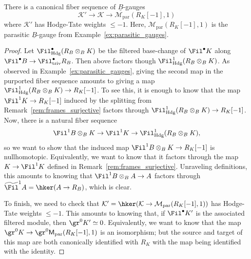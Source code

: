 \documentclass[10pt]{amsart}
\begin{document}
\begin{lemma}
\label{lem:factors_through_hodge}
There is a canonical fiber sequence of $\underline{B}$-gauges
\[
\mathcal{K}'\to \mathcal{K}\to \mathcal{M}_{\mathrm{par}}(R_K[-1],1)
\]
where $\mathcal{K}'$ has Hodge-Tate weights $\le -1$. Here, $\mathcal{M}_{\mathrm{par}}(R_K[-1],1)$ is the parasitic $\underline{B}$-gauge from Example~\ref{ex:parasitic_gauges}. 
\end{lemma}
\begin{proof}
Let $\Fil^\bullet_{\mathrm{Hdg}}(R_B\otimes_BK)$ be the filtered base-change of $\Fil^\bullet K$ along $\Fil^\bullet B\to \Fil^\bullet_{\mathrm{triv}}R_B$. Then  above factors though $\Fil^1_{\mathrm{Hdg}}(R_B\otimes_BK)$. As observed in Example~\ref{ex:parasitic_gauges}, giving the second map in the purported fiber sequence amounts to giving a map $\Fil^1_{\mathrm{Hdg}}(R_B\otimes_BK)\to R_K[-1]$. To see this, it is enough to know that the map $\Fil^1K\to R_K[-1]$ induced by the splitting from Remark~\ref{rem:frames_surjective} factors through $\Fil^1_{\mathrm{Hdg}}(R_B\otimes_BK)\to R_K[-1]$. Now, there is a natural fiber sequence
\[
\Fil^1B\otimes_BK \to \Fil^1K \to \Fil^1_{\mathrm{Hdg}}(R_B\otimes_BK),
\]
so we want to show that the induced map $\Fil^1B\otimes_BK\to R_K[-1]$ is nullhomotopic. Equivalently, we want to know that it factors through the map $K\to \Fil^1K$ defined in Remark~\ref{rem:frames_surjective}. Unraveling definitions, this amounts to knowing that $\Fil^1B\otimes_BA\to A$ factors through $\widetilde{\Fil}^1A = \hker(A\to R_B)$, which is clear.

To finish, we need to check that $\mathcal{K}' = \hker(\mathcal{K}\to \mathcal{M}_{\mathrm{par}}(R_K[-1],1))$ has Hodge-Tate weights $\leq -1$. This amounts to knowing that, if $\Fil^\bullet K'$ is the associated filtered module, then $\gr^0K' \simeq 0$. Equivalently, we want to know that the map $\gr^0K \to \gr^0\mathsf{M}_{\mathrm{par}}(R_K[-1],1)$ is an isomorphism; but the source and target of this map are both canonically identified with $R_K$ with the map being identified with the identity.
\end{proof}
\end{document}
